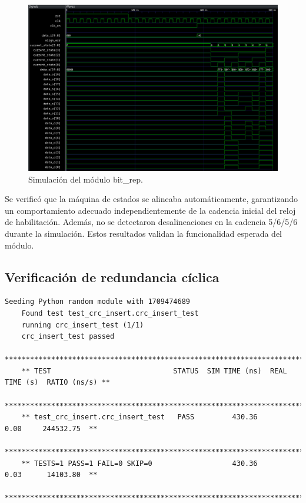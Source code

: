   \begin{figure}[htbp]
    \centering
    \includegraphics[width=1\textwidth]{./Figures/bit_rep.png}
    \caption{Simulación del módulo bit\_rep.}\label{fig:bit-rep}
  \end{figure}
  
  Se verificó que la máquina de estados se alineaba automáticamente, garantizando
  un comportamiento adecuado independientemente de la cadencia inicial del reloj
  de habilitación. Además, no se detectaron desalineaciones en la cadencia 5/6/5/6
  durante la simulación. Estos resultados validan la funcionalidad esperada del
  módulo.

\subsection{Verificación de redundancia cíclica}

  {\tiny\begin{lstlisting}[caption= "Resultados \textit{test} inserción de redundancia cíclica.]
    Seeding Python random module with 1709474689
    Found test test_crc_insert.crc_insert_test
    running crc_insert_test (1/1)
    crc_insert_test passed
    *****************************************************************************************
    ** TEST                             STATUS  SIM TIME (ns)  REAL TIME (s)  RATIO (ns/s) **
    *****************************************************************************************
    ** test_crc_insert.crc_insert_test   PASS         430.36           0.00     244532.75  **
    *****************************************************************************************
    ** TESTS=1 PASS=1 FAIL=0 SKIP=0                   430.36           0.03      14103.80  **
    *****************************************************************************************
  \end{lstlisting}}

